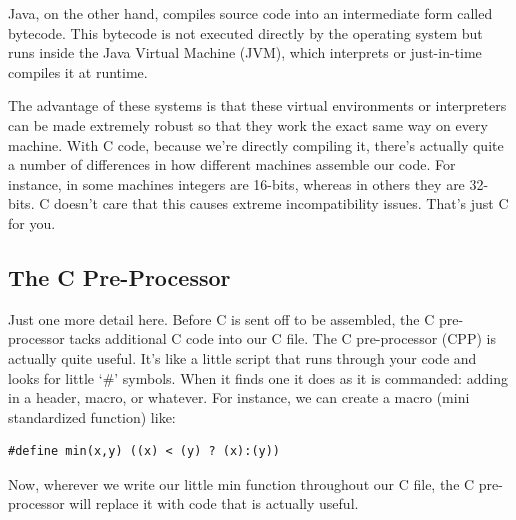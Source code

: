 \documentclass[12pt]{article}
\begin{document}
Java, on the other hand, compiles source code into an intermediate form called bytecode. This bytecode is not executed directly by the operating system but runs inside the Java Virtual Machine (JVM), which interprets or just-in-time compiles it at runtime.

The advantage of these systems is that these virtual environments or interpreters can be made extremely robust so that they work the exact same way on every machine. With C code, because we're directly compiling it, there's actually quite a number of differences in how different machines assemble our code. For instance, in some machines integers are 16-bits, whereas in others they are 32-bits. C doesn't care that this causes extreme incompatibility issues. That's just C for you.

\subsection*{The C Pre-Processor}

Just one more detail here. Before C is sent off to be assembled, the C pre-processor tacks additional C code into our C file. The C pre-processor (CPP) is actually quite useful. It's like a little script that runs through your code and looks for little `\#' symbols. When it finds one it does as it is commanded: adding in a header, macro, or whatever. For instance, we can create a macro (mini standardized function) like:

\begin{verbatim}
#define min(x,y) ((x) < (y) ? (x):(y))
\end{verbatim}

Now, wherever we write our little min function throughout our C file, the C pre-processor will replace it with code that is actually useful.
\end{document}
